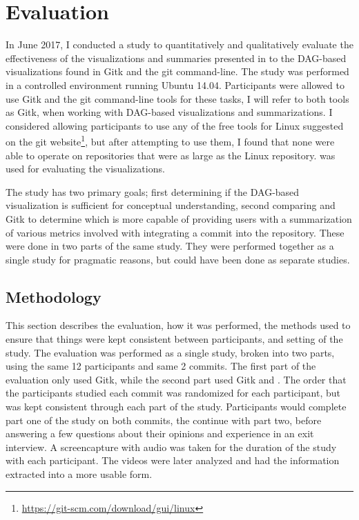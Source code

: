\chapter{Evaluation}

In June 2017, I conducted a study to quantitatively and qualitatively
evaluate the effectiveness of the visualizations and summaries presented
in \tool{} to the DAG-based visualizations found in Gitk and the git
command-line. The study was performed in a controlled environment
running Ubuntu 14.04. Participants were allowed to use Gitk and the git
command-line tools for these tasks, I will refer to both tools as Gitk,
when working with DAG-based visualizations and summarizations. I
considered allowing participants to use any of the free tools for Linux
suggested on the git
website\footnote{\url{https://git-scm.com/download/gui/linux}}, but
after attempting to use them, I found that none were able to operate on
repositories that were as large as the Linux repository. \tool{} was
used for evaluating the  visualizations.

The study has two primary goals; first determining if the DAG-based
visualization is sufficient for conceptual understanding, second
comparing \tool and Gitk to determine which is more capable of providing
users with a summarization of various metrics involved with integrating
a commit into the repository. These were done in two parts of the same
study. They were performed together as a single study for pragmatic
reasons, but could have been done as separate studies.

\section{Methodology}\label{sec:methodology}

This section describes the evaluation, how it was performed, the methods
used to ensure that things were kept consistent between participants,
and setting of the study. The evaluation was performed as a single
study, broken into two parts, using the same 12 participants and same 2
commits. The first part of the evaluation only used Gitk, while the
second part used Gitk and \tool{}. The order that the participants
studied each commit was randomized for each participant, but was kept
consistent through each part of the study. Participants would complete
part one of the study on both commits, the continue with part two, before
answering a few questions about their opinions and experience in an exit
interview. A screencapture with audio was taken for the duration of the
study with each participant. The videos were later analyzed and had the
information extracted into a more usable form.

